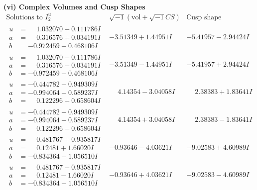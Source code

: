 \documentclass[1p]{elsarticle_modified}
\theoremstyle{definition}
\newcommand{\I}{\sqrt{-1}}
\begin{document}
\newpage\flushleft \textbf{(vi) Complex Volumes and Cusp Shapes}
$$\begin{array}{c|c|c}  
\text{Solutions to }I^u_{2}& \I (\text{vol} + \sqrt{-1}CS) & \text{Cusp shape}\\
 \hline 
\begin{aligned}
u &= \phantom{-}1.032070 + 0.111786 I \\
a &= \phantom{-}0.316576 + 0.034191 I \\
b &= -0.972459 + 0.468106 I\end{aligned}
 & -3.51349 + 1.44951 I & -5.41957 - 2.94424 I \\ \hline\begin{aligned}
u &= \phantom{-}1.032070 - 0.111786 I \\
a &= \phantom{-}0.316576 - 0.034191 I \\
b &= -0.972459 - 0.468106 I\end{aligned}
 & -3.51349 - 1.44951 I & -5.41957 + 2.94424 I \\ \hline\begin{aligned}
u &= -0.444782 + 0.949309 I \\
a &= -0.994064 - 0.589237 I \\
b &= \phantom{-}0.122296 + 0.658604 I\end{aligned}
 & \phantom{-}4.14354 - 3.04058 I & \phantom{-}2.38383 + 1.83641 I \\ \hline\begin{aligned}
u &= -0.444782 - 0.949309 I \\
a &= -0.994064 + 0.589237 I \\
b &= \phantom{-}0.122296 - 0.658604 I\end{aligned}
 & \phantom{-}4.14354 + 3.04058 I & \phantom{-}2.38383 - 1.83641 I \\ \hline\begin{aligned}
u &= \phantom{-}0.481767 + 0.935817 I \\
a &= \phantom{-}0.12481 + 1.66020 I \\
b &= -0.834364 - 1.056510 I\end{aligned}
 & -0.93646 - 4.03621 I & -9.02583 + 4.60989 I \\ \hline\begin{aligned}
u &= \phantom{-}0.481767 - 0.935817 I \\
a &= \phantom{-}0.12481 - 1.66020 I \\
b &= -0.834364 + 1.056510 I\end{aligned}
 & -0.93646 + 4.03621 I & -9.02583 - 4.60989 I \\ \hline\begin{aligned}

\end{aligned}
\end{array}$$
\end{document}
